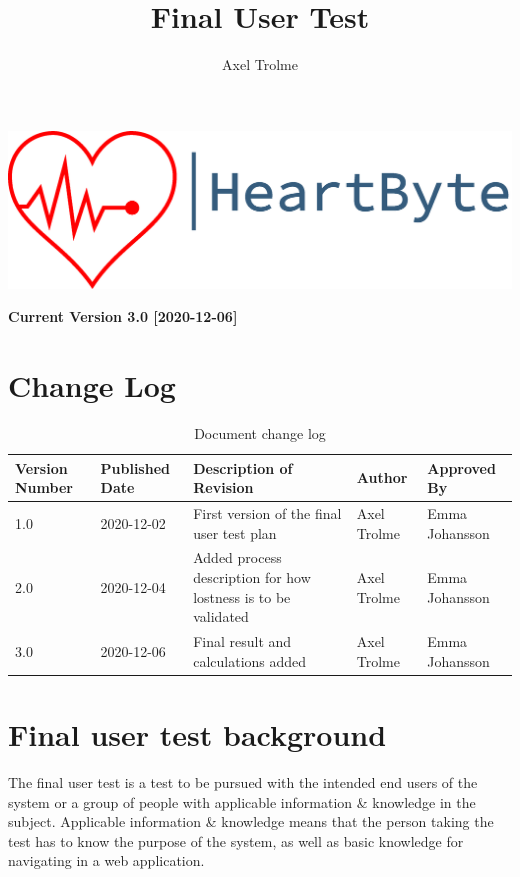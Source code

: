 \documentclass[12pt]{article}
\title{\Huge Final User Test}
\author{Axel Trolme}
\begin{document}
\maketitle
\vfill
\includegraphics[width=\linewidth]{Pictures/logo_heartbyte_transparent_v_1_1.png}

\vfill
\begin{center}
        \textbf{\large Current Version 3.0 [2020-12-06]}
\end{center}
\clearpage

\section{Change Log}
	
\begin{table}[H]

\begin{center}
\begin{tabular}{ | m{2cm} |m{2cm} |m{5cm}|m{4cm}|m{3cm}| } 
\hline
{Version Number} & {Published Date} & {Description of Revision}& {Author}& {Approved By} \\ 
\hline
1.0 & 2020-12-02 & First version of the final user test plan & Axel Trolme & Emma Johansson \\
\hline
2.0 & 2020-12-04 & Added process description for how lostness is to be validated & Axel Trolme & Emma Johansson \\
\hline
3.0 & 2020-12-06 & Final result and calculations added & Axel Trolme & Emma Johansson \\
\hline
\end{tabular}
\end{center}
\caption{\label{tab:changeLog}Document change log}
\end{table}
\clearpage
\tableofcontents
\clearpage

    \section{Final user test background}
    The final user test is a test to be pursued with the intended end users of the system or a group of people with applicable information \& knowledge in the subject. Applicable information \& knowledge means that the person taking the test has to know the purpose of the system, as well as basic knowledge for navigating in a web application. \\ 
    
\end{document}
